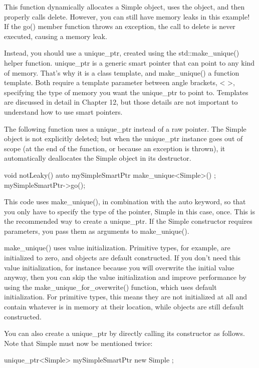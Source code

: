 This function dynamically allocates a Simple object, uses the object, and then properly calls delete. However, you can still have memory leaks in this example! If the go() member function throws an exception, the call to delete is never executed, causing a memory leak.

Instead, you should use a unique\_ptr, created using the std::make\_unique() helper function. unique\_ptr is a generic smart pointer that can point to any kind of memory. That’s why it is a class template, and make\_unique() a function template. Both require a template parameter between angle brackets, < >, specifying the type of memory you want the unique\_ptr to point to. Templates are discussed in detail in Chapter 12, but those details are not important to understand how to use smart pointers.

The following function uses a unique\_ptr instead of a raw pointer. The Simple object is not explicitly deleted; but when the unique\_ptr instance goes out of scope (at the end of the function, or because an exception is thrown), it automatically deallocates the Simple object in its destructor.

\begin{cpp}
void notLeaky()
{
    auto mySimpleSmartPtr { make_unique<Simple>() };
    mySimpleSmartPtr->go();
}
\end{cpp}

This code uses make\_unique(), in combination with the auto keyword, so that you only have to specify the type of the pointer, Simple in this case, once. This is the recommended way to create a unique\_ptr. If the Simple constructor requires parameters, you pass them as arguments to make\_unique().

make\_unique() uses value initialization. Primitive types, for example, are initialized to zero, and objects are default constructed. If you don’t need this value initialization, for instance because you will overwrite the initial value anyway, then you can skip the value initialization and improve performance by using the make\_unique\_for\_overwrite() function, which uses default initialization. For primitive types, this means they are not initialized at all and contain whatever is in memory at their location, while objects are still default constructed.

You can also create a unique\_ptr by directly calling its constructor as follows. Note that Simple must now be mentioned twice:

\begin{cpp}
unique_ptr<Simple> mySimpleSmartPtr { new Simple{} };
\end{cpp}

